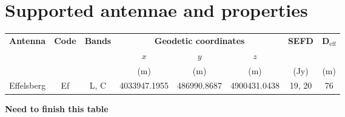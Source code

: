 \documentclass[11pt]{report_jfr}
\begin{document}
\appendix

\section{Supported antennae and properties}\label{a:supported_antennae}

\begin{longtable}{cccccccc}
	\toprule
	\textbf{Antenna} & \textbf{Code} & \textbf{Bands} & \multicolumn{3}{c}{\textbf{Geodetic coordinates}} & \textbf{SEFD} & $\boldsymbol{D}_\mathrm{eff}$\\
	& & & $x$ & $y$ & $z$ & & \\
	& & & (m) & (m) & (m) & (Jy) & (m) \\
	\hline\endhead
	Effelsberg & Ef & L, C & 4033947.1955 & 486990.8687 & 4900431.0438 & 19, 20 & 76 \\
\end{longtable}
\textbf{Need to finish this table}
\end{document}
